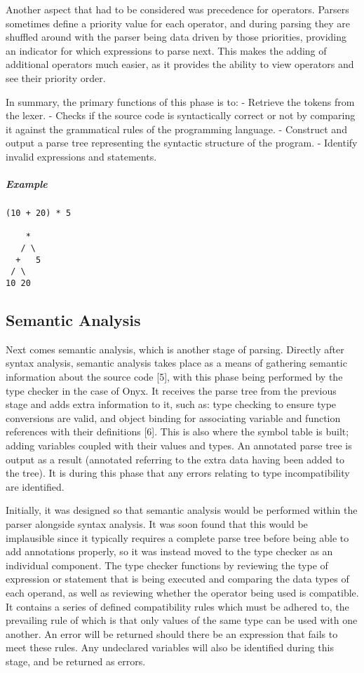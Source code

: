 \documentclass[
]{report}
\begin{document}
Another aspect that had to be considered was precedence for operators.
Parsers sometimes define a priority value for each operator, and during
parsing they are shuffled around with the parser being data driven by
those priorities, providing an indicator for which expressions to parse
next. This makes the adding of additional operators much easier, as it
provides the ability to view operators and see their priority order.

In summary, the primary functions of this phase is to: - Retrieve the
tokens from the lexer. - Checks if the source code is syntactically
correct or not by comparing it against the grammatical rules of the
programming language. - Construct and output a parse tree representing
the syntactic structure of the program. - Identify invalid expressions
and statements.

\subparagraph{Example}
\begin{verbatim}
(10 + 20) * 5

    *
   / \
  +   5
 / \  
10 20
\end{verbatim}

\subsection{Semantic Analysis}
Next comes semantic analysis, which is another stage of parsing.
Directly after syntax analysis, semantic analysis takes place as a means
of gathering semantic information about the source code {[}5{]}, with
this phase being performed by the type checker in the case of Onyx. It
receives the parse tree from the previous stage and adds extra
information to it, such as: type checking to ensure type conversions are
valid, and object binding for associating variable and function
references with their definitions {[}6{]}. This is also where the symbol
table is built; adding variables coupled with their values and types. An
annotated parse tree is output as a result (annotated referring to the
extra data having been added to the tree). It is during this phase that
any errors relating to type incompatibility are identified.

Initially, it was designed so that semantic analysis would be performed
within the parser alongside syntax analysis. It was soon found that this
would be implausible since it typically requires a complete parse tree
before being able to add annotations properly, so it was instead moved
to the type checker as an individual component. The type checker
functions by reviewing the type of expression or statement that is being
executed and comparing the data types of each operand, as well as
reviewing whether the operator being used is compatible. It contains a
series of defined compatibility rules which must be adhered to, the
prevailing rule of which is that only values of the same type can be
used with one another. An error will be returned should there be an
expression that fails to meet these rules. Any undeclared variables will
also be identified during this stage, and be returned as errors.
\end{document}
